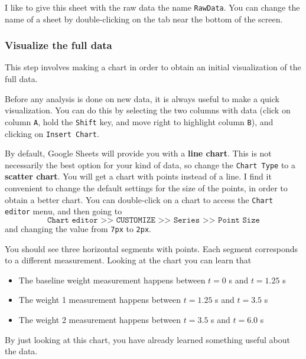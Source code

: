 I like to give this sheet with the raw data the name \texttt{RawData}. You can change the name of a sheet by double-clicking on the tab near the bottom of the screen.
%
\subsubsection{Visualize the full data}
%
This step involves making a chart in order to obtain an initial visualization of the full data.

Before any analysis is done on new data, it is always useful to make a quick visualization. You can do this by selecting the two columns with data (click on column \texttt{A}, hold the \texttt{Shift} key, and move right to highlight column \texttt{B}), and clicking on \texttt{Insert Chart}.

By default, Google Sheets will provide you with a \textbf{line chart}. This is not necessarily the best option for your kind of data, so change the \texttt{Chart Type} to a \textbf{scatter chart}. You will get a chart with points instead of a line. I find it convenient to change the default settings for the size of the points, in order to obtain a better chart. You can double-click on a chart to access the \texttt{Chart editor} menu, and then going to
\begin{equation}
    \texttt{Chart editor >> CUSTOMIZE >> Series >> Point Size}
\end{equation}
and changing the value from \texttt{7px} to \texttt{2px}.

You should see three horizontal segments with points. Each segment corresponds to a different measurement. Looking at the chart you can learn that
\begin{itemize}
    \item The baseline weight measurement happens between $t = 0$ s and $t = 1.25$ s
    \item The weight 1 measurement happens between $t = 1.25$ s and $t = 3.5$ s
    \item The weight 2 measurement happens between $t = 3.5$ s and $t = 6.0$ s
\end{itemize}
By just looking at this chart, you have already learned something useful about the data.
%
\begin{center}
\end{center}
%
